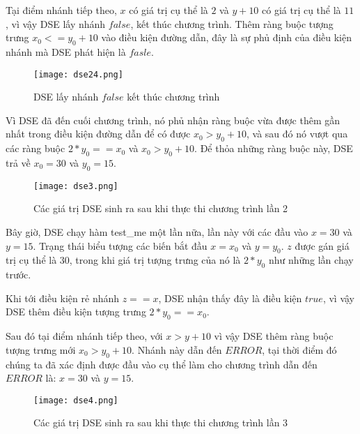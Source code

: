 Tại điểm nhánh tiếp theo, $x$ có giá trị cụ thể là $2$ và $y + 10$ có giá trị cụ thể là $11$, vì vậy DSE lấy nhánh $false$, kết thúc chương trình. Thêm ràng buộc tượng trưng $x_{0} <= y_{0} + 10$ vào điều kiện đường dẫn, đây là sự phủ định của điều kiện nhánh mà DSE phát hiện là $fasle$.

\begin{center}
	\begin{figure}[H]
		\begin{center}
			\texttt{[image: dse24.png]}
		\end{center}
		\caption{DSE lấy nhánh $false$ kết thúc chương trình}
		\label{dse24}
	\end{figure}
\end{center} 

Vì DSE đã đến cuối chương trình, nó phủ nhận ràng buộc vừa được thêm gần nhất trong điều kiện đường dẫn để có được $ x_{0} > y_{0} + 10 $, và sau đó nó vượt qua các ràng buộc $ 2*y_{0} == x_{0} $ và $ x_{0} > y_{0} + 10$. Để thỏa những ràng buộc này, DSE trả về $x_{0} = 30$ và $y_{0} = 15$.

\begin{center}
	\begin{figure}[H]
		\begin{center}
			\texttt{[image: dse3.png]}
		\end{center}
		\caption{Các giá trị DSE sinh ra sau khi thực thi chương trình lần 2}
		\label{dse3}
	\end{figure}
\end{center}

Bây giờ, DSE chạy hàm test\_me một lần nữa, lần này với các đầu vào $x = 30$ và $y = 15$. Trạng thái biểu tượng các biến bắt đầu $x = x_{0}$ và $y = y_{0}$. $z$ được gán giá trị cụ thể là $30$, trong khi giá trị tượng trưng của nó là $2*y_0$ như những lần chạy trước.

Khi tới điều kiện rẻ nhánh $z == x$, DSE nhận thấy đây là điều kiện $true$, vì vậy DSE thêm điều kiện tượng trưng $2*y_{0} == x_{0}$.

Sau đó tại điểm nhánh tiếp theo, với $x > y + 10$ vì vậy DSE thêm ràng buộc tượng trưng mới $ x_{0} > y_{0}+ 10 $. Nhánh này dẫn đến $ERROR$, tại thời điểm đó chúng ta đã xác định được đầu vào cụ thể làm cho chương trình dẫn đến $ERROR$ là: $x = 30$ và $y = 15$.

\begin{center}
	\begin{figure}[H]
		\begin{center}
			\texttt{[image: dse4.png]}
		\end{center}
		\caption{Các giá trị DSE sinh ra sau khi thực thi chương trình lần 3}
		\label{dse4}
	\end{figure}
\end{center}

